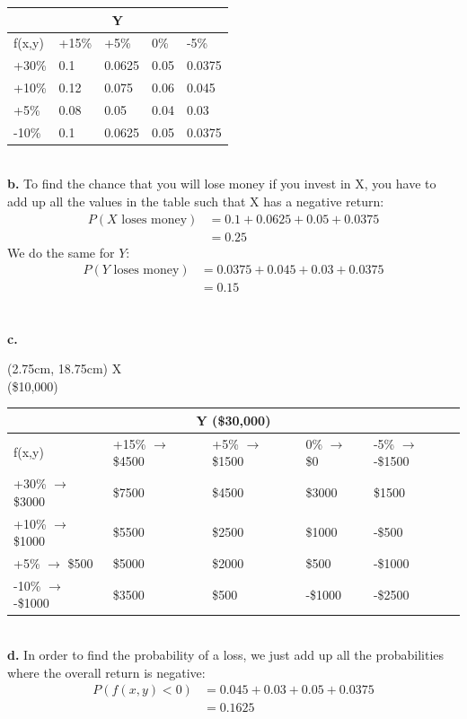 \documentclass[12pt]{report}
\begin{document}
\begin{tabular}{|p{2cm}||p{2cm}|p{2cm}|p{2cm}|p{2cm}|}
	\multicolumn{5}{c}{Y} \\
	\hline
	f(x,y) & +15\% & +5\% & 0\% & -5\%\\
	\hline
	\hline
	+30\% & 0.1 & 0.0625 & 0.05 & 0.0375\\
	\hline
	+10\% & 0.12 & 0.075 & 0.06 & 0.045\\
	\hline
	+5\% & 0.08 & 0.05 & 0.04 & 0.03\\
	\hline
	-10\% & 0.1 & 0.0625 & 0.05 & 0.0375\\
	\hline
\end{tabular}
\bigskip\\
\noindent \textbf{b.} To find the chance that you will lose money if you invest in X, you have to add up all the values in the table such that X has a negative return: 
\begin{align*}
P(X\text{ loses money}) &= 0.1 + 0.0625 + 0.05 + 0.0375\\
&= \boxed{0.25}
\end{align*}
\noindent We do the same for $Y$:
\begin{align*}
P(Y\text{ loses money}) &= 0.0375 + 0.045 + 0.03 + 0.0375\\
&= \boxed{0.15}
\end{align*}
\noindent {}
\\\\
\noindent \textbf{c.} 

\begin{textblock*}{1cm}(2.75cm, 18.75cm)
	X\\
	(\$10,000)
\end{textblock*}

\begin{tabular}{|p{3cm}||p{2.8cm}|p{2.7cm}|p{2.5cm}|p{2.5cm}|}
	\multicolumn{5}{c}{Y (\$30,000)} \\
	\hline
	f(x,y) & +15\% $\rightarrow$ \$4500& +5\% $\rightarrow$ \$1500& 0\% $\rightarrow$ \$0& -5\% $\rightarrow$ -\$1500\\
	\hline
	\hline
	+30\%  $\rightarrow$ \$3000& \$7500 & \$4500 & \$3000 & \$1500\\
	\hline
	+10\% $\rightarrow$ \$1000& \$5500 & \$2500 & \$1000 & -\$500\\
	\hline
	+5\% $\rightarrow$ \$500& \$5000 & \$2000 & \$500 & -\$1000\\
	\hline
	-10\% $\rightarrow$ -\$1000& \$3500 & \$500 & -\$1000 & -\$2500\\
	\hline
\end{tabular}
\bigskip\\
\noindent \textbf{d.} In order to find the probability of a loss, we just add up all the probabilities where the overall return is negative:
\begin{align*}
P(f(x,y) < 0) &= 0.045 + 0.03 + 0.05 + 0.0375\\
&= \boxed{0.1625}
\end{align*}
\end{document}

